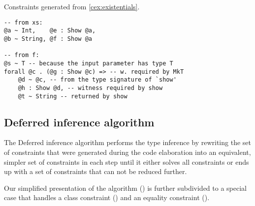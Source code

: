 \begin{codex}
\caption{Constraints generated from \cref{cex:existentials}.}
\label{cex:exist-constr}
\begin{lstlisting}[style=haskellStyle]
-- from xs:
@a ~ Int,    @e : Show @a,
@b ~ String, @f : Show @a

-- from f:
@s ~ T -- because the input parameter has type T
forall @c . (@g : Show @c) => -- w. required by MkT
    @d ~ @c, -- from the type signature of `show'
    @h : Show @d, -- witness required by show
    @t ~ String -- returned by show
\end{lstlisting}
\end{codex}

\FloatBarrier
\subsection{Deferred inference algorithm}

The Deferred inference algorithm performs the type inference by rewriting the set of constraints that were generated during the code elaboration into an equivalent, simpler set of constraints in each step until it either solves all constraints or ends up with a set of constraints that can not be reduced further. \cite{peytonjones2019type}

Our simplified presentation of the algorithm () is further subdivided to a special case that handles a class constraint () and an equality constraint ().

